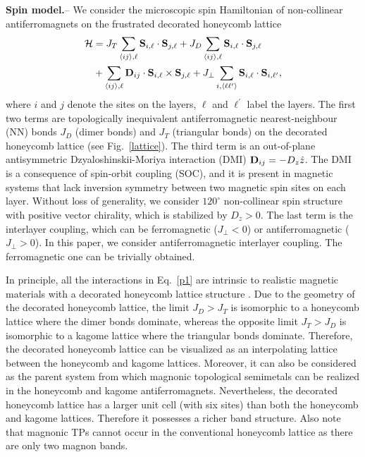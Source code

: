 \documentclass[doublecol]{epl2}
\def\ra{\rangle}
\def\la{\langle}
\begin{document}
 \textbf{Spin model.}-- We consider the microscopic  spin Hamiltonian of non-collinear antiferromagnets on the frustrated decorated honeycomb lattice
\begin{align}
\mathcal H&=J_T\sum_{\la ij\ra,\ell} {\bf S}_{i,\ell}\cdot{\bf S}_{j,\ell} + J_D\sum_{\la ij\ra,\ell} {\bf S}_{i,\ell}\cdot{\bf S}_{j,\ell}\label{p1}\\&\nonumber+\sum_{\la ij\ra,\ell}\bold{D}_{ij}\cdot {\bf S}_{i,\ell}\times{\bf S}_{j,\ell}+ J_\perp\sum_{i,\la \ell \ell^\prime\ra}{\bf S}_{i,\ell}\cdot{\bf S}_{i,\ell^\prime},
\end{align}
where $i$ and $j$ denote the sites on  the  layers, $\ell$ and $\ell^\prime$ label the layers.  The first two terms are  topologically inequivalent antiferromagnetic nearest-neighbour (NN) bonds $J_D$ (dimer bonds) and $J_T$ (triangular  bonds) on the decorated honeycomb lattice (see Fig.~\ref{lattice}).  The third term is an out-of-plane antisymmetric  Dzyaloshinskii-Moriya interaction  (DMI) \cite{dm1,dm2}  $\bold D_{ij}= - D_z \hat{z}$. The DMI is a consequence of spin-orbit coupling (SOC), and it is present in magnetic systems that lack  inversion symmetry between two magnetic spin sites on each layer. Without loss of generality, we  consider $120^\circ$ non-collinear spin structure with positive vector chirality, which is stabilized by $D_z>0$.  The last term is the interlayer coupling, which can be ferromagnetic ($J_\perp<0$) or antiferromagnetic ($J_\perp>0$). In this paper, we consider antiferromagnetic interlayer coupling. The ferromagnetic one can be trivially obtained.


   In principle, all the interactions in Eq.~\eqref{p1} are intrinsic to realistic magnetic materials with a decorated honeycomb lattice structure \cite{zheng}.  Due to the geometry of the decorated honeycomb lattice, the limit $J_D>J_T$ is isomorphic to a honeycomb lattice where the dimer bonds dominate, whereas the opposite limit $J_T>J_D$ is isomorphic to a kagome lattice where the triangular bonds dominate. Therefore, the decorated honeycomb lattice  can be visualized as an interpolating lattice between the honeycomb and kagome lattices. Moreover, it can also be considered as the parent system  from which magnonic topological semimetals can be realized in the honeycomb and kagome antiferromagnets.  Nevertheless, the decorated honeycomb lattice has a larger unit cell (with six sites)  than both the honeycomb and kagome lattices. Therefore it possesses a richer band structure. Also note that  magnonic TPs cannot occur in the conventional honeycomb lattice as there are only two magnon bands.
\end{document}
